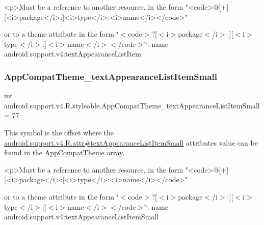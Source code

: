 \begin{DoxyVerb}      <p>Must be a reference to another resource, in the form "<code>@[+][<i>package</i>:]<i>type</i>:<i>name</i></code>"
\end{DoxyVerb}
 or to a theme attribute in the form \char`\"{}$<$code$>$?\mbox{[}$<$i$>$package$<$/i$>$\+:\mbox{]}\mbox{[}$<$i$>$type$<$/i$>$\+:\mbox{]}$<$i$>$name$<$/i$>$$<$/code$>$\char`\"{}.  name android.\+support.\+v4\+:text\+Appearance\+List\+Item \mbox{\label{classandroid_1_1support_1_1v4_1_1R_1_1styleable_a7130801a509563566260e6edc992a049}} 
\subsubsection{\texorpdfstring{App\+Compat\+Theme\+\_\+text\+Appearance\+List\+Item\+Small}{AppCompatTheme\_textAppearanceListItemSmall}}
{\footnotesize\ttfamily int android.\+support.\+v4.\+R.\+styleable.\+App\+Compat\+Theme\+\_\+text\+Appearance\+List\+Item\+Small = 77\hspace{0.3cm}{\ttfamily [static]}}

This symbol is the offset where the \hyperlink{classandroid_1_1support_1_1v4_1_1R_1_1attr_a29c6c481b3ead94f36b0ffc18e7bc247}{android.\+support.\+v4.\+R.\+attr\#text\+Appearance\+List\+Item\+Small} attribute\textquotesingle{}s value can be found in the \hyperlink{classandroid_1_1support_1_1v4_1_1R_1_1styleable_ac07ebbe62ed977f6dcaadc6397840ace}{App\+Compat\+Theme} array.

\begin{DoxyVerb}      <p>Must be a reference to another resource, in the form "<code>@[+][<i>package</i>:]<i>type</i>:<i>name</i></code>"
\end{DoxyVerb}
 or to a theme attribute in the form \char`\"{}$<$code$>$?\mbox{[}$<$i$>$package$<$/i$>$\+:\mbox{]}\mbox{[}$<$i$>$type$<$/i$>$\+:\mbox{]}$<$i$>$name$<$/i$>$$<$/code$>$\char`\"{}.  name android.\+support.\+v4\+:text\+Appearance\+List\+Item\+Small \mbox{\label{classandroid_1_1support_1_1v4_1_1R_1_1styleable_aa2cece194eee07266ff9a9a5dd1bf22b}} 
